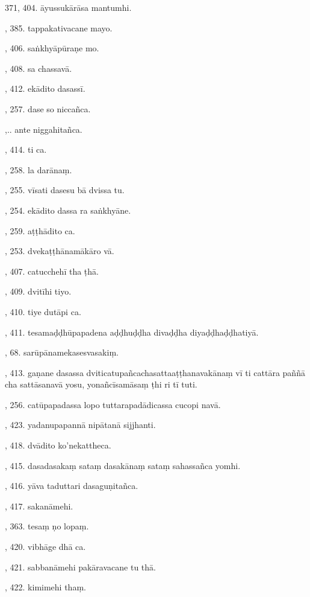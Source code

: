 371, 404. āyussukārāsa mantumhi.\par {}, 385. tappakativacane mayo.\par {}, 406. saṅkhyāpūraṇe mo.\par {}, 408. sa chassavā.\par {}, 412. ekādito dasassī.\par {}, 257. dase so niccañca.\par {},.. ante niggahitañca.\par {}, 414. ti ca.\par {}, 258. la darānaṃ.\par {}, 255. vīsati dasesu bā dvissa tu.\par {}, 254. ekādito dassa ra saṅkhyāne.\par {}, 259. aṭṭhādito ca.\par {}, 253. dvekaṭṭhānamākāro vā.\par {}, 407. catucchehī tha ṭhā.\par {}, 409. dvitīhi tiyo.\par {}, 410. tiye dutāpi ca.\par {}, 411. tesamaḍḍhūpapadena aḍḍhuḍḍha divaḍḍha diyaḍḍhaḍḍhatiyā.\par {}, 68. sarūpānamekasesvasakiṃ.\par {}, 413. gaṇane dasassa dviticatupañcachasattaaṭṭhanavakānaṃ vī ti cattāra paññā cha sattāsanavā yosu, yonañcīsamāsaṃ ṭhi ri tī tuti.\par {}, 256. catūpapadassa lopo tuttarapadādicassa cucopi navā.\par {}, 423. yadanupapannā nipātanā sijjhanti.\par {}, 418. dvādito ko’nekattheca.\par {}, 415. dasadasakaṃ sataṃ dasakānaṃ sataṃ sahassañca yomhi.\par {}, 416. yāva taduttari dasaguṇitañca.\par {}, 417. sakanāmehi.\par {}, 363. tesaṃ ṇo lopaṃ.\par {}, 420. vibhāge dhā ca.\par {}, 421. sabbanāmehi pakāravacane tu thā.\par {}, 422. kimimehi thaṃ.\par \noindent
